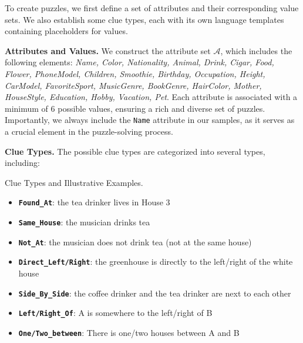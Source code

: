  

To create puzzles, we first define a set of attributes and their corresponding value sets. We also establish some clue types, each with its own language templates containing placeholders for values. 


\textbf{Attributes and Values.} 
We construct the attribute set $\mathcal{A}$, which includes the following elements: \textit{Name, Color, Nationality, Animal, Drink, Cigar, Food, Flower, PhoneModel, Children, Smoothie, Birthday, Occupation, Height, CarModel, FavoriteSport, MusicGenre, BookGenre, HairColor, Mother, HouseStyle, Education, Hobby, Vacation, Pet}. Each attribute is associated with a minimum of 6 possible values, ensuring a rich and diverse set of puzzles. Importantly, we always include the \texttt{Name} attribute in our samples, as it serves as a crucial element in the puzzle-solving process. 

\textbf{Clue Types.} 
The possible clue types are categorized into several types, including:
\begin{AIbox}{Clue Types and Illustrative Examples.}
    \small 
    \begin{itemize}[leftmargin=0.5em]
        \item \texttt{\textbf{Found\_At}}: the tea drinker lives in House 3
        \item \texttt{\textbf{Same\_House}}: the musician drinks tea
        \item \texttt{\textbf{Not\_At}}: the musician does not drink tea (not at the same house)
        \item \texttt{\textbf{Direct\_Left/Right}}: the greenhouse is directly to the left/right of the white house
        \item \texttt{\textbf{Side\_By\_Side}}: the coffee drinker and the tea drinker are next to each other
        \item \texttt{\textbf{Left/Right\_Of}}: A is somewhere to the left/right of B
        \item \texttt{\textbf{One/Two\_between}}: There is one/two houses between A and B
    \end{itemize}
\end{AIbox}

